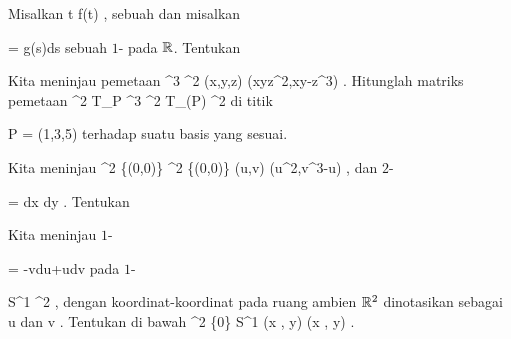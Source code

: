 {}
{

Misalkan
 {\R} {\R
} { t } {f(t)
} {,}
sebuah
dan misalkan

\mavergleichskette
{\vergleichskette
{ \omega
}
{ = }{ g(s)ds
}
{  }{
}
{    }{
}
{   }{
}
}
{}{}{}
sebuah
$1$-
pada ${\mathbb R}$. Tentukan

}
{} {}

{}
{

Kita meninjau pemetaan
\maabbeledisp {\varphi} {\R^3} {\R^2
} {(x,y,z)} {(xyz^2,xy-z^3)
} {.}
Hitunglah matriks pemetaan
 { \bigwedge^2 T_P \R^3 } { \bigwedge^2 T_{\varphi(P)}  \R^2
} {}
di titik

\mavergleichskette
{\vergleichskette
{ P
}
{ = }{ (1,3,5)
}
{  }{
}
{    }{
}
{   }{
}
}
{}{}{}
terhadap suatu basis yang sesuai.

}
{} {}

{}
{

Kita meninjau
\maabbeledisp {\varphi} {\R^2 \setminus \{(0,0)\}} {\R^2 \setminus \{(0,0)\}
} {(u,v)} {(u^2,v^3-u)
} {,}
dan
$2$-

\mavergleichskettedisp
{\vergleichskette
{ \omega
}
{ =} { {  } dx \wedge dy
}
{ } {
}
{ } {
}
{ } {
}
}
{}{}{.}
Tentukan


}
{} {}

{}
{

Kita meninjau
$1$-

\mavergleichskettedisp
{\vergleichskette
{ \omega
}
{ =} { -vdu+udv
}
{ } {
}
{ } {
}
{ } {
}
}
{}{}{}
pada
$1$-

\mavergleichskette
{\vergleichskette
{ S^1
}
{ \subset }{ \R^2
}
{  }{
}
{    }{
}
{   }{
}
}
{}{}{,}
dengan koordinat-koordinat pada ruang ambien ${\mathbb R}^2$ dinotasikan sebagai
\mathkor {} {u} {dan} {v} {.}
Tentukan
\mathl{\pi^* \omega}{} di bawah
\maabbeledisp {\pi} {\R^2 \setminus \{0\}} { S^{1}
} {(x , y) } { {  } (x , y)
} {.}

}
{} {}

